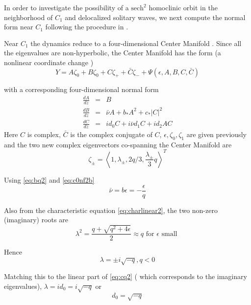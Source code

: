 In order to investigate the possibility of a $ \mathrm{sech}^2 $  homoclinic orbit in
the neighborhood of $C_1$ and delocalized solitary waves, we next compute the
normal form near $C_1$ following the procedure in \cite{IA}.

Near $C_1$ the dynamics reduce to a four-dimensional Center Manifold \cite{IA}.
Since all the eigenvalues are non-hyperbolic, the Center Manifold has the form
(a nonlinear coordinate change \cite{IA})
\begin{equation} \label{eq:c1cm2}
Y = A \zeta_0 + B \zeta_0 + C \zeta_+ + \bar{C} \zeta_- + \Psi(\epsilon,A,B,C,\bar{C})
\end{equation}

with  a corresponding four-dimensional normal form
\begin{subequations}\label{eq:c1nf}
\begin{eqnarray}
\frac{dA}{dz} &=& B \label{eq:aq2} \\
\frac{dB}{dz} &=& \bar{\nu} A + b_* A^2 + c_* \left|C\right|^2  \label{eq:bq2} \\
\frac{dC}{dz} &=& i d_0 C + i \bar{\nu} d_1 C + i d_2 A C \label{eq:cq2}
\end{eqnarray}
\end{subequations}
Here $C$ is complex, $\bar{C}$ is the complex conjugate of $C$, $\epsilon,
\zeta_0, \zeta_1$ are given previously and the two new complex eigenvectors
co-spanning the Center Manifold are
\begin{equation}
\zeta_\pm	 = \left< 1, \lambda_\pm, 2 q / 3, \frac{\lambda_\pm}{3} q\right>^T 
\end{equation}

Using \eqref{eq:bq2} and \eqref{eq:c0nf2b}
\begin{equation}
\bar{\nu} = b \epsilon = -\frac{\epsilon}{q} 
\end{equation}

Also from the characteristic equation \eqref{eq:charlinear2}, the two non-zero 
(imaginary) roots are 
\begin{equation}
\lambda^2 = \frac{ q + \sqrt{q^2 + 4 \epsilon } }{2} \approx q \textrm{ for } \epsilon \textrm{ small }
\end{equation}

Hence
\begin{equation}
\lambda = \pm i \sqrt{-q}, q < 0
\end{equation}

Matching this to the linear part of \eqref{eq:cq2} ( which corresponds to the
imaginary eigenvalues), $\lambda = i d_0 = i \sqrt{-q}$ or 
\begin{equation}
d_0 = \sqrt{-q}
\end{equation}


